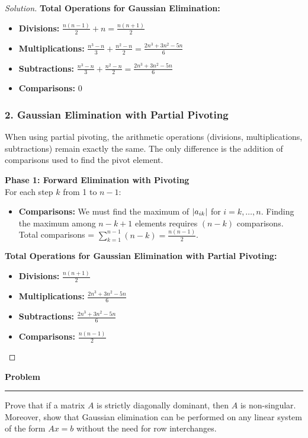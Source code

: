 \documentclass[11pt, a4paper]{article}
\DeclarePairedDelimiter\abs{\lvert}{\rvert}
\newenvironment{problem}{%
  \begin{tcolorbox}[
    colback=blue!4!white,
    colframe=blue!38!black,
    boxrule=0.95pt,
    arc=3pt,
    left=11pt,
    right=11pt,
    top=10pt,
    bottom=11pt,
    before skip=12pt,
    after skip=14pt,
  ]
  \noindent\textbf{\textcolor{blue!35!black}{Problem}}\par\nointerlineskip
  {\color{blue!42!black}\rule{\linewidth}{0.55pt}}\par\vspace{0.55em}%
}{%
  \end{tcolorbox}%
}
\newif\ifsolutionnewpage
\newenvironment{solution}
  {\begin{proof}[Solution]}
  {\end{proof}\ifsolutionnewpage\newpage\fi}
\begin{document}
\begin{solution}
    \textbf{Total Operations for Gaussian Elimination:}
    \begin{itemize}
        \item \textbf{Divisions:} $\frac{n(n-1)}{2} + n = \frac{n(n+1)}{2}$
        \item \textbf{Multiplications:} $\frac{n^3-n}{3} + \frac{n^2-n}{2} = \frac{2n^3 + 3n^2 - 5n}{6}$
        \item \textbf{Subtractions:} $\frac{n^3-n}{3} + \frac{n^2-n}{2} = \frac{2n^3 + 3n^2 - 5n}{6}$
        \item \textbf{Comparisons:} $0$
    \end{itemize}

    \subsubsection*{2. Gaussian Elimination with Partial Pivoting}
    When using partial pivoting, the arithmetic operations (divisions, multiplications, subtractions) remain exactly the same. The only difference is the addition of comparisons used to find the pivot element.

    \textbf{Phase 1: Forward Elimination with Pivoting} \\
    For each step $k$ from 1 to $n-1$:
    \begin{itemize}
        \item \textbf{Comparisons:} We must find the maximum of $\abs{a_{ik}}$ for $i = k, \dots, n$. Finding the maximum among $n-k+1$ elements requires $(n-k)$ comparisons. \\
        Total comparisons = $\sum_{k=1}^{n-1} (n-k) = \frac{n(n-1)}{2}$.
    \end{itemize}

    \textbf{Total Operations for Gaussian Elimination with Partial Pivoting:}
    \begin{itemize}
        \item \textbf{Divisions:} $\frac{n(n+1)}{2}$
        \item \textbf{Multiplications:} $\frac{2n^3 + 3n^2 - 5n}{6}$
        \item \textbf{Subtractions:} $\frac{2n^3 + 3n^2 - 5n}{6}$
        \item \textbf{Comparisons:} $\frac{n(n-1)}{2}$
    \end{itemize}
\end{solution}

\begin{problem}
    Prove that if a matrix $A$ is strictly diagonally dominant, then $A$ is non-singular. Moreover, show that Gaussian elimination can be performed on any linear system of the form $Ax=b$ without the need for row interchanges.
\end{problem}
\end{document}

